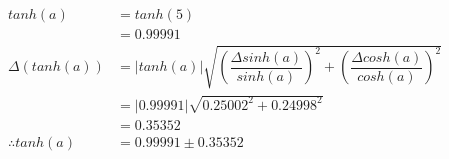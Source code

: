 \documentclass[a4paper]{article}
\begin{document}
\begin{align*}
tanh \left( a \right) &= tanh \left( 5 \right) \\
&= 0.99991 \\[4mm]
\Delta \left( tanh \left( a \right) \right) &= \left| tanh \left( a \right) \right|\sqrt{ \left( \dfrac{ \Delta sinh \left( a \right) }{ sinh \left( a \right) } \right) ^ { 2 } + \left( \dfrac{ \Delta cosh \left( a \right) }{ cosh \left( a \right) } \right) ^ { 2 }} \\
&= \left| 0.99991 \right|\sqrt{ 0.25002 ^ { 2 } + 0.24998 ^ { 2 }} \\
&= 0.35352\\[4mm]
\therefore tanh \left( a \right) &= 0.99991 \pm 0.35352
\end{align*}
\end{document}

